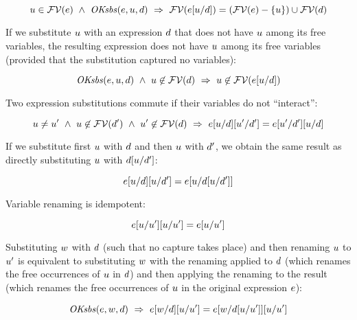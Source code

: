\begin{theorem}\label{thm-efvar-of-esbs}
\[
u\in\mathcal{FV}(e)\ \wedge\ 
\mathit{OKsbs}(e,u,d)\ \Rightarrow\ 
\mathcal{FV}(e[u/d])=(\mathcal{FV}(e)-\{u\})\cup\mathcal{FV}(d)
\]
\end{theorem}

If we substitute $u$ with an expression $d$ that does not have
$u$ among its free variables, the resulting expression does not have
$u$ among its free variables (provided that the substitution captured no
variables):

\begin{theorem}\label{thm-var-not-in-esbs-of-var}
\[
\mathit{OKsbs}(e,u,d)\ \wedge\ u\not\in\mathcal{FV}(d)\ \Rightarrow\ 
u\not\in\mathcal{FV}(e[u/d])
\]
\end{theorem}

Two expression substitutions commute if their variables do not ``interact'':

\begin{theorem}\label{thm-esbs-comm}
\[
u\neq u'\ \wedge\ 
u\not\in\mathcal{FV}(d')\ \wedge\ 
u'\not\in\mathcal{FV}(d)\ \Rightarrow\ 
e[u/d][u'/d']=
e[u'/d'][u/d]
\]
\end{theorem}

If we substitute first $u$ with $d$ and then $u$ with $d'$,
we obtain the same result as directly substituting $u$ with
$d[u/d']$:

\begin{theorem}\label{thm-esbs-esbs-of-same-var}
\[
e[u/d][u/d']=
e[u/d[u/d']]
\]
\end{theorem}

Variable renaming is idempotent:

\begin{theorem}\label{thm-var-rename-idemp}
\[
e[u/u'][u/u']=e[u/u']
\]
\end{theorem}

Substituting $w$ with $d$ (such that no capture takes place) and
then renaming $u$ to $u'$ is equivalent to substituting $w$ with
the renaming applied to $d$ (which renames the free occurrences of
$u$ in $d$) and then applying the renaming to the result (which
renames the free occurrences of $u$ in the original expression $e$):

\begin{theorem}\label{thm-esbs-then-rename}
\[
\mathit{OKsbs}(e,w,d)\ \Rightarrow\ 
e[w/d][u/u']=
e[w/d[u/u']][u/u']
\]
\end{theorem}

